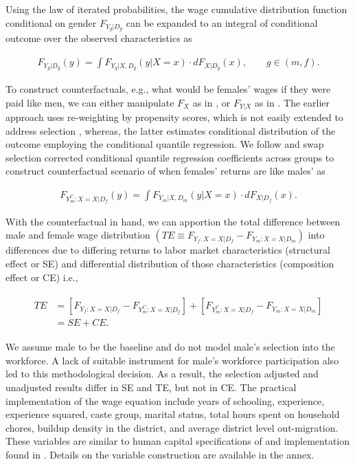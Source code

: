  

Using the law of iterated probabilities, the wage cumulative distribution function conditional on gender $F_{Y_{g}|D_{g}}$ can be expanded to an integral of conditional outcome over the observed characteristics as
\begin{linenomath*}\begin{align}
	F_{Y_{g}|D_{g}}(y) = \int F_{Y_{g}|X,D_{g}}(y|X=x)\cdot dF_{X|D_{g}}(x), \hspace{2em} g\in (m,f). 
\end{align}\end{linenomath*}
To construct counterfactuals, e.g., what would be females' wages if they were paid like men, we can either manipulate $F_{X}$ as in \textcite{DiNardo1996}, or $F_{Y|X}$ as in \textcite{Chernozhukov2013}. The earlier approach uses re-weighting by propensity scores, which is not easily extended to address selection  \parencite{Maasoumi2017}, whereas, the latter estimates conditional distribution of the outcome employing the conditional quantile regression. We follow \textcite{Chernozhukov2013} and swap selection corrected conditional quantile regression coefficients across groups to construct counterfactual scenario of when females' returns are like males' as 
\begin{linenomath*}\begin{align}
	F_{Y_{m}^{C}:X=X|D_{f}}(y) = \int F_{Y_{m}|X,D_{m}}(y|X=x)\cdot dF_{X|D_{f}}(x).
\end{align}\end{linenomath*}

With the counterfactual in hand, we can apportion the total difference between male and female wage distribution $(TE \equiv F_{Y_{f}:X=X|D_{f}}  - F_{Y_{m}:X=X|D_{m}})$
into differences due to differing returns to labor market characteristics (structural effect or SE) and differential distribution of those characteristics (composition effect or CE) i.e.,
\begin{linenomath*}\begin{align}
	\begin{split}		
		TE &= \left[F_{Y_{f}:X=X|D_{f}} - F_{Y_{m}^{C}:X=X|D_{f}}\right] + \left[F_{Y_{m}^{C}:X=X|D_{f}} - F_{Y_{m}:X=X|D_{m}}\right]\\
		&= SE + CE. \label{eq:TEdefn}
	\end{split}
\end{align}\end{linenomath*}

We assume male to be the baseline and do not model male's selection into the workforce. A lack of suitable instrument for male's workforce participation also led to this methodological decision. As a result, the selection adjusted and unadjusted results differ in SE and TE, but not in CE. The practical implementation of the wage equation include years of schooling, experience, experience squared, caste group, marital status, total hours spent on household chores, buildup density in the district, and average district level out-migration. These variables are similar to human capital specifications of \textcite{Blau2017} and implementation found in \textcite{Maasoumi2019}. Details on the variable construction are available in the annex.\par 
                                   
